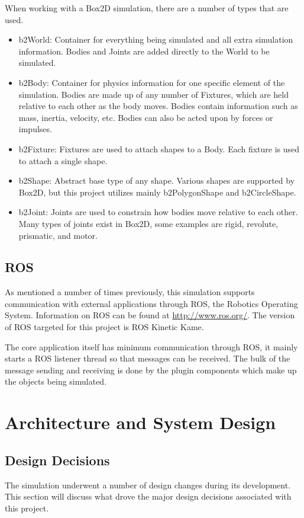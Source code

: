 When working with a Box2D simulation, there are a number of types that are used.
\begin{itemize}
	\item b2World: Container for everything being simulated and all extra simulation information. Bodies and Joints are added directly to the World to be simulated.
	\item b2Body: Container for physics information for one specific element of the simulation. Bodies are made up of any number of Fixtures, which are held relative to each other as the body moves. Bodies contain information such as mass, inertia, velocity, etc. Bodies can also be acted upon by forces or impulses.
	\item b2Fixture: Fixtures are used to attach shapes to a Body. Each fixture is used to attach a single shape.
	\item b2Shape: Abstract base type of any shape. Various shapes are supported by Box2D, but this project utilizes mainly b2PolygonShape and b2CircleShape.
	\item b2Joint: Joints are used to constrain how bodies move relative to each other. Many types of joints exist in Box2D, some examples are rigid, revolute, prismatic, and motor.
\end{itemize}

\subsection{ROS}
As mentioned a number of times previously, this simulation supports communication with external applications through ROS, the Robotics Operating System. Information on ROS can be found at \url{http://www.ros.org/}. The version of ROS targeted for this project is ROS Kinetic Kame.

The core application itself has minimum communication through ROS, it mainly starts a ROS listener thread so that messages can be received. The bulk of the message sending and receiving is done by the plugin components which make up the objects being simulated.

\newpage
 \section{Architecture and System Design} 	
 \subsection{Design Decisions}
  	The simulation underwent a number of design changes during its development. This section will discuss what drove the major design decisions associated with this project.

